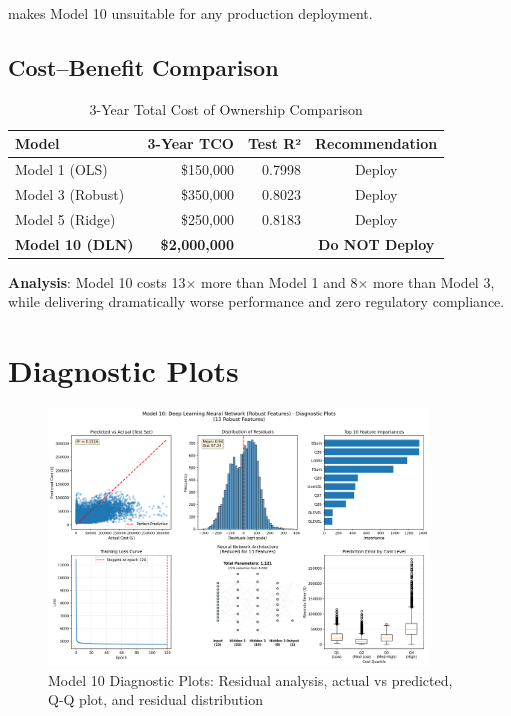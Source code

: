makes Model 10 unsuitable for any production deployment.

\subsection{Cost--Benefit Comparison}

\begin{table}[h]
\centering
\caption{3-Year Total Cost of Ownership Comparison}
\begin{tabular}{lrrc}
\toprule
\textbf{Model} & \textbf{3-Year TCO} & \textbf{Test R²} & \textbf{Recommendation} \\
\midrule
Model 1 (OLS) & \$150,000 & 0.7998 &  Deploy \\
Model 3 (Robust) & \$350,000 & 0.8023 &  Deploy \\
Model 5 (Ridge) & \$250,000 & 0.8183 &  Deploy \\
\textbf{Model 10 (DLN)} & \textbf{\$2,000,000} & \textbf{\ModelTenRSquaredTest{}} &  \textbf{Do NOT Deploy} \\
\bottomrule
\end{tabular}
\end{table}

\textbf{Analysis}: Model 10 costs 13× more than Model 1 and 8× more than Model 3, while delivering dramatically worse performance and zero regulatory compliance.

\section{Diagnostic Plots}

\begin{figure}[h]
\centering
\includegraphics[width=0.9\textwidth]{models/model_10/diagnostic_plots.png}
\caption{Model 10 Diagnostic Plots: Residual analysis, actual vs predicted, Q-Q plot, and residual distribution}
\label{fig:model10diagnostics}
\end{figure}

